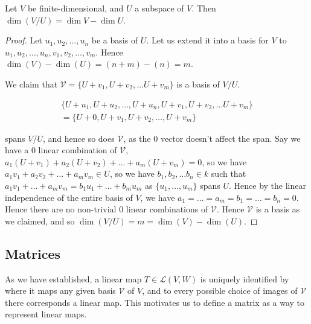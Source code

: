 \documentclass[]{article}
\begin{document}
\begin{thm}
		Let $V$ be finite-dimensional, and $U$ a subspace of $V$. Then $\dim (V / U) = \dim V - \dim U$.
\end{thm}

\begin{proof}
		Let $u_1, u_2, \ldots, u_n$ be a basis of $U$. Let us extend it into a basis for $V$ to $u_1, u_2, \ldots, u_n, v_1, v_2, \ldots, v_m$.	Hence $\dim(V) - \dim(U) = (n + m) - (n) = m$. 

		We claim that $\mathcal{V} = \{U + v_1, U + v_2, \ldots U + v_m\}$ is a basis of $V / U$. 

		\begin{align*}
			\{U + u_1, U + u_2, \ldots, U + u_n, U + v_1, U + v_2, \ldots U + v_m\} \\
			= \{U + 0, U + v_1, U + v_2, \ldots, U + v_m\}	
		\end{align*}

		spans $V / U$, and hence so does $\mathcal{V}$, as the $0$ vector doesn't affect the span. Say we have a $0$ linear combination of $\mathcal{V}$, $a_1 (U + v_1) + a_2 (U + v_2) + \ldots + a_m (U + v_m) = 0$, so we have $a_1 v_1 + a_2 v_2 + \ldots + a_m v_m \in U$, so we have $b_1, b_2, \ldots b_n \in k$ such that $a_1 v_1 + \ldots + a_m v_m = b_1 u_1 + \ldots + b_m u_m$ as $\{u_1, \ldots, u_m\}$ spans $U$. Hence by the linear independence of the entire basis of $V$, we have $a_1 = \ldots = a_m = b_1 = \ldots = b_n = 0$. Hence there are no non-trivial $0$ linear combinations of $\mathcal{V}$. Hence $\mathcal{V}$ is a basis as we claimed, and so $\dim (V / U) = m = \dim(V) - \dim(U)$.
\end{proof}

\subsection{Matrices}

As we have established, a linear map $T \in \mathcal{L}(V,W)$ is uniquely identified by where it maps any given basis $\mathcal{V}$ of $V$, and to every possible choice of images of $\mathcal{V}$ there corresponds a linear map. This motivates us to define a matrix as a way to represent linear maps.
\end{document}
